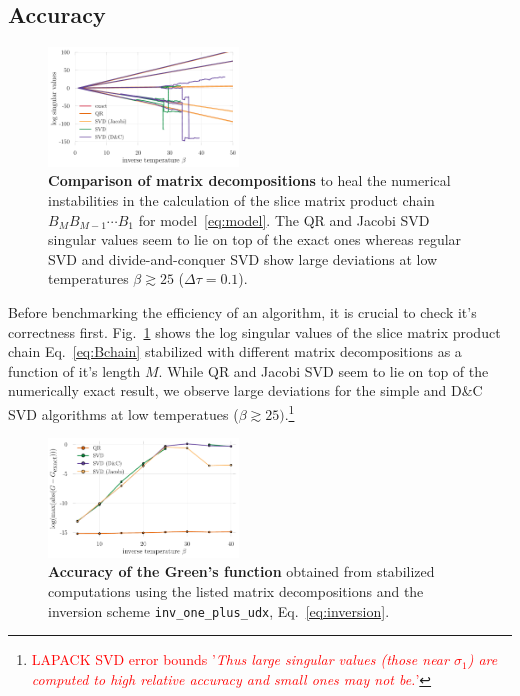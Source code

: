 \documentclass[%
 reprint,
superscriptaddress,
citeautoscript,
showpacs,
 amsmath,amssymb,
 aps,
 prb,
longbibliography,
]{revtex4-1}
\begin{document}
\subsection{Accuracy}

\begin{figure}
	\includegraphics[width=0.45\textwidth]{../notebooks/decomp_comparison_simple.pdf}
	\caption{\textbf{Comparison of matrix decompositions} to heal the numerical instabilities in the calculation of the slice matrix product chain $B_M B_{M-1} \cdots B_1$ for model~\eqref{eq:model}. The QR and Jacobi SVD singular values seem to lie on top of the exact ones whereas regular SVD and divide-and-conquer SVD show large deviations at low temperatures $\beta \gtrsim 25$ ($\Delta \tau = 0.1$). \label{fig:decomp_comparison_simple}}
\end{figure}

Before benchmarking the efficiency of an algorithm, it is crucial to check it's correctness first. Fig.~\ref{fig:decomp_comparison_simple} shows the log singular values of the slice matrix product chain Eq.~\ref{eq:Bchain} stabilized with different matrix decompositions as a function of it's length $M$. While QR and Jacobi SVD seem to lie on top of the numerically exact result, we observe large deviations for the simple and D\&C SVD algorithms at low temperatues ($\beta \gtrsim 25)$.\footnote{\textcolor{red}{LAPACK SVD error bounds\cite{errorbounds} '\textit{Thus large singular values (those near $\sigma_1$) are computed to high relative accuracy and small ones may not be.}'}}\\

\begin{figure}[t]
	\includegraphics[width=0.45\textwidth]{../notebooks/accuracy_greens_svd_regularinv.pdf}
	\caption{\textbf{Accuracy of the Green's function} obtained from stabilized computations using the listed matrix decompositions and the inversion scheme \texttt{inv\_one\_plus\_udx}, Eq.~\eqref{eq:inversion}. \label{fig:greens_accuracy_regularinv}}
\end{figure}
\end{document}
